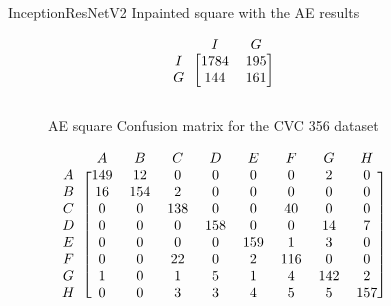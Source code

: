 \begin{figure}[h]
\caption{InceptionResNetV2 Inpainted square with the AE results}
\myfontsize
\caption*{\footnotesize \textmd{ \textbf{A}:{dyed-lifted-polyps} , \textbf{B}:{dyed-resection-margins} , \textbf{C}:{esophagitis} , \textbf{D}:{normal-cecum} , \textbf{E}:{normal-pylorus} , \textbf{F}:{normal-z-line} , \textbf{G}:{polyps} , \textbf{H}:{ulcerative-colitis} , \textbf{I}:{non-polyp}}}

\begin{subfigure}[b]{0.25\textwidth}
     
\[
\begin{blockarray}{ccc}
& I & G  \\
\begin{block}{c[cc]}
        I&1784  &  195\\
        G& 144 &  161\\
\end{block}
\end{blockarray}
 \]         

\caption{AE square Confusion matrix for the CVC 356 dataset}
\label{mat:cvc356_CM_IRV2_AE_SQUARE}
\end{subfigure}
\begin{subfigure}[b]{0.49\textwidth}  
\scriptsize     
\[
\begin{blockarray}{ccccccccc}
& A & B & C & D & E & F & G & H \\
\begin{block}{c[cccccccc]}
A&149 & 12 & 0 & 0 & 0 & 0 & 2 & 0\\
B& 16 & 154 & 2 & 0 & 0 & 0 & 0 & 0\\
C&  0 & 0 & 138 & 0 & 0 & 40 & 0 & 0\\
D&  0 & 0 & 0 & 158 & 0 & 0 & 14 & 7\\
E&  0 & 0 & 0 & 0 & 159 & 1 & 3 & 0\\
F&  0 & 0 & 22 & 0 & 2 & 116 & 0 & 0\\
G&  1 & 0 & 1 & 5 & 1 & 4 & 142 & 2\\
H&  0 & 0 & 3 & 3 & 4 & 5 & 5 & 157\\
\end{block}
\end{blockarray}
 \]        
        

\end{subfigure}
\end{figure}
